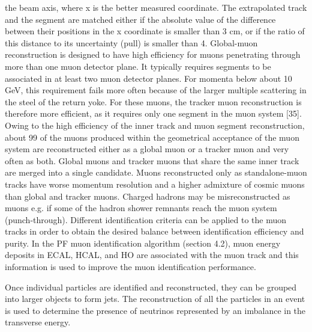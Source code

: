 the beam axis, where x is the better measured coordinate. The extrapolated track and the
segment are matched either if the absolute value of the difference between their positions in
the x coordinate is smaller than 3 cm, or if the ratio of this distance to its uncertainty (pull)
is smaller than 4.
Global-muon reconstruction is designed to have high efficiency for muons penetrating through
more than one muon detector plane. It typically requires segments to be associated in at least two
muon detector planes. For momenta below about 10 GeV, this requirement fails more often because
of the larger multiple scattering in the steel of the return yoke. For these muons, the tracker muon
reconstruction is therefore more efficient, as it requires only one segment in the muon system [35].
Owing to the high efficiency of the inner track and muon segment reconstruction, about 99%
of the muons produced within the geometrical acceptance of the muon system are reconstructed
either as a global muon or a tracker muon and very often as both. Global muons and tracker muons
that share the same inner track are merged into a single candidate. Muons reconstructed only as
standalone-muon tracks have worse momentum resolution and a higher admixture of cosmic muons
than global and tracker muons.
Charged hadrons may be misreconstructed as muons e.g. if some of the hadron shower remnants
reach the muon system (punch-through). Different identification criteria can be applied to the muon
tracks in order to obtain the desired balance between identification efficiency and purity. In the
PF muon identification algorithm (section 4.2), muon energy deposits in ECAL, HCAL, and HO
are associated with the muon track and this information is used to improve the muon identification
performance.








\noindent Once individual particles are identified and reconstructed, they can be grouped into larger objects to form jets. The reconstruction of all the particles in an event is used to determine the presence of neutrinos represented by an imbalance in the transverse energy.



